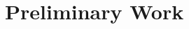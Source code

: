 \documentclass[18pt,xcolor=table]{beamer}
\begin{document}





%                      
%                      
%      
\section{Preliminary Work}
\end{document}
